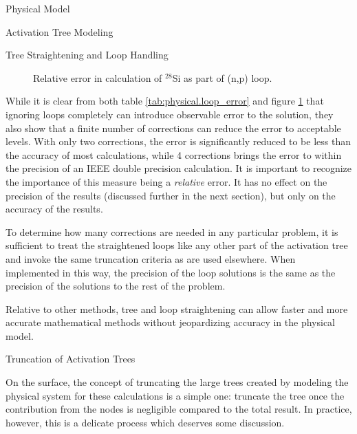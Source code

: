 \begin{chapter}{Physical Model\label{chap:physical}}
\begin{section}{Activation Tree Modeling\label{sec:physical.chains}}
\begin{subsection}{Tree Straightening and Loop Handling}
    \begin{figure}[htbp]
      \begin{center}
        \leavevmode
        \caption{Relative error in calculation of $^{28}$Si as part of (n,p) loop.}
        \label{fig:physical.loop_error}
      \end{center}
    \end{figure}

    While it is clear from both table \ref{tab:physical.loop_error}
    and figure \ref{fig:physical.loop_error} that ignoring loops
    completely can introduce observable error to the solution, they
    also show that a finite number of corrections can reduce the error
    to acceptable levels.  With only two corrections, the error is
    significantly reduced to be less than the accuracy of most
    calculations, while 4 corrections brings the error to within the
    precision of an IEEE double precision calculation.  It is
    important to recognize the importance of this measure being a
    \textsl{relative} error.  It has no effect on the precision of the
    results (discussed further in the next section), but only on the
    accuracy of the results.
    
    To determine how many corrections are needed in any particular
    problem, it is sufficient to treat the straightened loops like any
    other part of the activation tree and invoke the same truncation
    criteria as are used elsewhere.  When implemented in this way, the
    precision of the loop solutions is the same as the precision of
    the solutions to the rest of the problem.
    
    Relative to other methods, tree and loop straightening can allow
    faster and more accurate mathematical methods without jeopardizing
    accuracy in the physical model.
  \end{subsection}

  \begin{subsection}{Truncation of Activation Trees}
    
    On the surface, the concept of truncating the large trees created
    by modeling the physical system for these calculations is a simple
    one: truncate the tree once the contribution from the nodes is
    negligible compared to the total result.  In practice, however,
    this is a delicate process which deserves some discussion.
    

\end{subsection}
\end{section}
\end{chapter}
